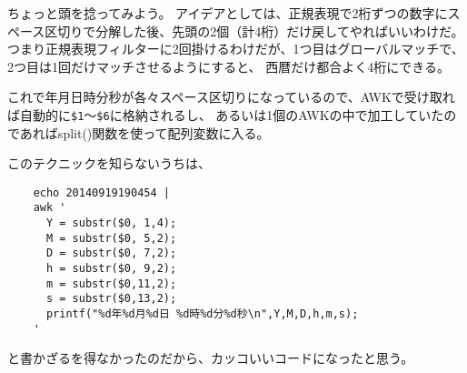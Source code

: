 ちょっと頭を捻ってみよう。
アイデアとしては、正規表現で2桁ずつの数字にスペース区切りで分解した後、先頭の2個（計4桁）だけ戻してやればいいわけだ。
つまり正規表現フィルターに2回掛けるわけだが、1つ目はグローバルマッチで、2つ目は1回だけマッチさせるようにすると、
西暦だけ都合よく4桁にできる。

これで年月日時分秒が各々スペース区切りになっているので、AWKで受け取れば自動的に\verb|$1|～\verb|$6|に格納されるし、
あるいは1個のAWKの中で加工していたのであればsplit()関数を使って配列変数に入る。

このテクニックを知らないうちは、
\begin{verbatim}
	echo 20140919190454 |
	awk '
	  Y = substr($0, 1,4);
	  M = substr($0, 5,2);
	  D = substr($0, 7,2);
	  h = substr($0, 9,2);
	  m = substr($0,11,2);
	  s = substr($0,13,2);
	  printf("%d年%d月%d日 %d時%d分%d秒\n",Y,M,D,h,m,s);
	'
\end{verbatim}

\noindent
と書かざるを得なかったのだから、カッコいいコードになったと思う。
